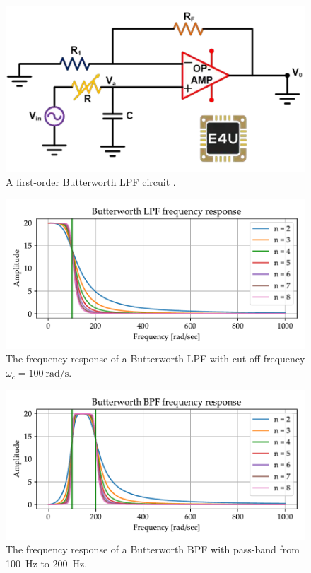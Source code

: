 \documentclass[../ECE459FinalProjectReport.tex]{subfiles}
\begin{document}
\begin{figure}[b]
    \centering
    \includegraphics[scale=.5]{plots/1order_butterLPF.png}
    \caption{A first-order Butterworth LPF circuit \cite{ButterworthFilterWhat2021}.}
    \label{fig:butter-ckt}
\end{figure}
\begin{figure}[tb]
    \centering
    \includegraphics[scale=.8]{plots/butterworth-lpf-nolog.pdf}
    \caption{The frequency response of a Butterworth LPF with cut-off frequency $\omega_c = \SI{100}{\radian\per\s}$.}
    \label{fig:butter-lpf}
\end{figure}
\begin{figure}[tb]
    \centering
    \includegraphics[scale=.8]{plots/butterworth-bpf-nolog.pdf}
    \caption{The frequency response of a Butterworth BPF with pass-band from \SI{100}{Hz} to \SI{200}{Hz}.}
    \label{fig:butter-bpf}
\end{figure}
\end{document}
